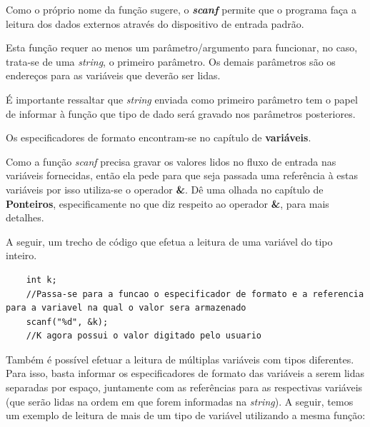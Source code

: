 \documentclass[12pt]{article}
\newcommand\tab[1][1cm]{\hspace*{#1}}
\begin{document}
\par\tab Como o próprio nome da função sugere, o \textbf{\textit{scanf}} permite que o programa faça a leitura dos dados externos através do dispositivo de entrada padrão.

\par\tab Esta função requer ao menos um parâmetro/argumento para funcionar, no caso, trata-se de uma \textit{string}, o primeiro parâmetro. Os demais parâmetros são os endereços para as variáveis que deverão ser lidas.

\par\tab É importante ressaltar que \textit{string} enviada como primeiro parâmetro tem o papel de informar à função que tipo de dado será gravado nos parâmetros posteriores.

\hspace{0.25cm}
\begin{tcolorbox}[colback=violet!5!white,colframe=violet!75!black,title=Dica!]
  \par\tab Os especificadores de formato encontram-se no capítulo de \textbf{variáveis}.
\end{tcolorbox}

\hspace{0.25cm}
\begin{tcolorbox}[colback=yellow!5!white,colframe=yellow!75!black,title=Atenção!]
  \par\tab Como a função \textit{scanf} precisa gravar os valores lidos no fluxo de entrada nas variáveis fornecidas, então ela pede para que seja passada uma referência à estas variáveis por isso utiliza-se o operador \textbf{\&}. Dê uma olhada no capítulo de \textbf{Ponteiros}, especificamente no que diz respeito ao operador \textbf{\&}, para mais detalhes.
\end{tcolorbox}

\par\tab A seguir, um trecho de código que efetua a leitura de uma variável do tipo inteiro.

\hspace{0.25cm}
\begin{lstlisting}
    int k;
    //Passa-se para a funcao o especificador de formato e a referencia para a variavel na qual o valor sera armazenado
    scanf("%d", &k);
    //K agora possui o valor digitado pelo usuario
\end{lstlisting}

\par\tab Também é possível efetuar a leitura de múltiplas variáveis com tipos diferentes. Para isso, basta informar os especificadores de formato das variáveis a serem lidas separadas por espaço, juntamente com as referências para as respectivas variáveis (que serão lidas na ordem em que forem informadas na \textit{string}). A seguir, temos um exemplo de leitura de mais de um tipo de variável utilizando a mesma função:
\end{document}
